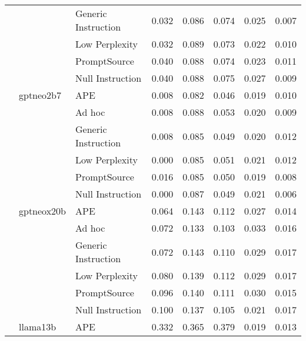 \begin{supertabular}{lllrrrrr}
              &        & Generic Instruction &            0.032 &           0.086 &          0.074 &        0.025 &    0.007 \\
              &        & Low Perplexity &            0.032 &           0.089 &          0.073 &        0.022 &    0.010 \\
              &        & PromptSource &            0.040 &           0.088 &          0.074 &        0.023 &    0.011 \\
              &        & Null Instruction &            0.040 &           0.088 &          0.075 &        0.027 &    0.009 \\
              & gptneo2b7 & APE &            0.008 &           0.082 &          0.046 &        0.019 &    0.010 \\
              &        & Ad hoc &            0.008 &           0.088 &          0.053 &        0.020 &    0.009 \\
              &        & Generic Instruction &            0.008 &           0.085 &          0.049 &        0.020 &    0.012 \\
              &        & Low Perplexity &            0.000 &           0.085 &          0.051 &        0.021 &    0.012 \\
              &        & PromptSource &            0.016 &           0.085 &          0.050 &        0.019 &    0.008 \\
              &        & Null Instruction &            0.000 &           0.087 &          0.049 &        0.021 &    0.006 \\
              & gptneox20b & APE &            0.064 &           0.143 &          0.112 &        0.027 &    0.014 \\
              &        & Ad hoc &            0.072 &           0.133 &          0.103 &        0.033 &    0.016 \\
              &        & Generic Instruction &            0.072 &           0.143 &          0.110 &        0.029 &    0.017 \\
              &        & Low Perplexity &            0.080 &           0.139 &          0.112 &        0.029 &    0.017 \\
              &        & PromptSource &            0.096 &           0.140 &          0.111 &        0.030 &    0.015 \\
              &        & Null Instruction &            0.100 &           0.137 &          0.105 &        0.021 &    0.017 \\
              & llama13b & APE &            0.332 &           0.365 &          0.379 &        0.019 &    0.013 \\

\end{supertabular}
